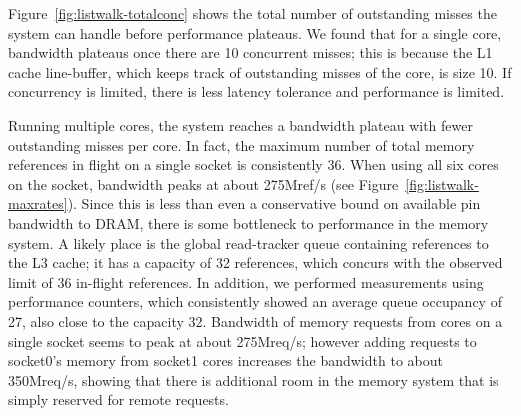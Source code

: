 	 Figure~\ref{fig:listwalk-totalconc} shows the total number of outstanding misses the system can handle before performance plateaus. We found that for a single core, bandwidth plateaus once there are 10 concurrent misses; this is because the L1 cache line-buffer, which keeps track of outstanding misses of the core, is size 10. If concurrency is limited, there is less latency tolerance and performance is limited. 

	Running multiple cores, the system reaches a bandwidth plateau with fewer outstanding misses per core. In fact, the maximum number of total memory references in flight on a single socket is consistently 36. When using all six cores on the socket, bandwidth peaks at about 275Mref/s (see Figure~\ref{fig:listwalk-maxrates}). Since this is less than even a conservative bound on available pin bandwidth to DRAM, there is some bottleneck to performance in the memory system. A likely place is the global read-tracker queue containing references to the L3 cache; it has a capacity of 32 references, which concurs with the observed limit of 36 in-flight references. In addition, we performed measurements using performance counters, which consistently showed an average queue occupancy of 27, also close to the capacity 32.
   
	Bandwidth of memory requests from cores on a single socket seems to peak at about 275Mreq/s; however adding requests to socket0's memory from socket1 cores increases the bandwidth to about 350Mreq/s, showing that there is additional room in the memory system that is simply reserved for remote requests.


